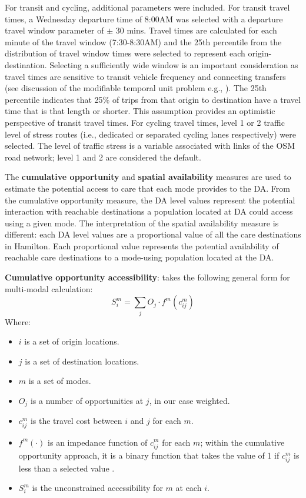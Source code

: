 \documentclass[
  authoryear,
  preprint,
  3p]{elsarticle}
\providecommand{\tightlist}{%
  \setlength{\itemsep}{0pt}\setlength{\parskip}{0pt}}\usepackage{longtable,booktabs,array}
\def\tightlist{}
\begin{document}
For transit and cycling, additional parameters were included. For
transit travel times, a Wednesday departure time of 8:00AM was selected
\citep{boisjolyDailyFluctuationsTransit2016} with a departure travel
window parameter of \(\pm\) 30 mins. Travel times are calculated for
each minute of the travel window (7:30-8:30AM) and the 25th percentile
from the distribution of travel window times were selected to represent
each origin-destination. Selecting a sufficiently wide window is an
important consideration as travel times are sensitive to transit vehicle
frequency and connecting transfers (see discussion of the modifiable
temporal unit problem e.g.,
\citep{pereiraFutureAccessibilityImpacts2019}). The 25th percentile
indicates that 25\% of trips from that origin to destination have a
travel time that is that length or shorter. This assumption provides an
optimistic perspective of transit travel times. For cycling travel
times, level 1 or 2 traffic level of stress routes (i.e., dedicated or
separated cycling lanes respectively) were selected. The level of
traffic stress is a variable associated with links of the OSM road
network; level 1 and 2 are considered the default.

The \textbf{cumulative opportunity} and \textbf{spatial availability}
measures are used to estimate the potential access to care that each
mode provides to the DA. From the cumulative opportunity measure, the DA
level values represent the potential interaction with reachable
destinations a population located at DA could access using a given mode.
The interpretation of the spatial availability measure is different:
each DA level values are a proportional value of all the care
destinations in Hamilton. Each proportional value represents the
potential availability of reachable care destinations to a mode-using
population located at the DA.

\textbf{Cumulative opportunity accessibility}: takes the following
general form for multi-modal calculation: \[
S_i^m=\sum_{j}O_j\cdot f^m(c_{ij}^m)
\] \noindent Where:

\begin{itemize}
\tightlist
\item
  \(i\) is a set of origin locations.
\item
  \(j\) is a set of destination locations.
\item
  \(m\) is a set of modes.
\item
  \(O_j\) is a number of opportunities at \(j\), in our case weighted.
\item
  \(c_{ij}^m\) is the travel cost between \(i\) and \(j\) for each
  \(m\).
\item
  \(f^m(\cdot)\) is an impedance function of \(c^m_{ij}\) for each
  \(m\); within the cumulative opportunity approach, it is a binary
  function that takes the value of 1 if \(c^m_{ij}\) is less than a
  selected value \citep{handyMeasuringAccessibilityExploration1997}.
\item
  \(S^m_{i}\) is the unconstrained accessibility for \(m\) at each
  \(i\).
\end{itemize}
\end{document}
